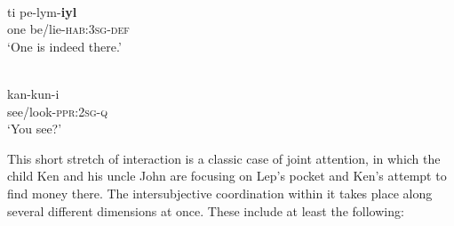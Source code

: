 \documentclass[output=paper]{langsci/langscibook}
\begin{document}
	\ex \label{ex:ar28e}
	\\
	\gll ti pe-lym-\textbf{iyl}\\
	one be/lie-\textsc{hab}:3\textsc{sg}-\textsc{def}\\
	\glt ‘One is indeed there.’	
	
	\ex \label{ex:ar28f}
	\\ 
	\gll kan-kun-i\\
	see/look-\textsc{ppr}:2\textsc{sg}-\textsc{q}\\
	\glt ‘You see?’
\z \z

This short stretch of interaction is a classic case of joint attention, in which the child Ken and his uncle John are focusing on Lep’s pocket and Ken’s attempt to find money there.  The intersubjective coordination within it takes place along several different dimensions at once. These include at least the following:
\end{document}
